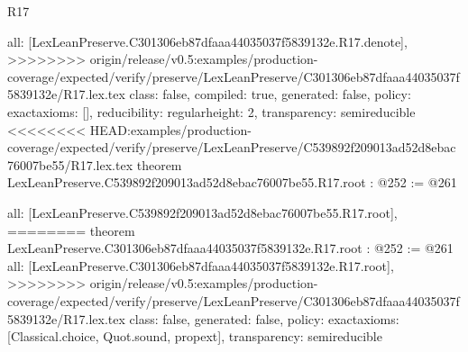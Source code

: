 \begin{lexlean}{R17}
\begin{coremodule}
{{{{{  all: [LexLeanPreserve.C301306eb87dfaaa44035037f5839132e.R17.denote],
>>>>>>>> origin/release/v0.5:examples/production-coverage/expected/verify/preserve/LexLeanPreserve/C301306eb87dfaaa44035037f5839132e/R17.lex.tex
  class: false,
  compiled: true,
  generated: false,
  policy: exact{axioms: []},
  reducibility: regular{height: 2},
  transparency: semireducible
}
<<<<<<<< HEAD:examples/production-coverage/expected/verify/preserve/LexLeanPreserve/C539892f209013ad52d8ebac76007be55/R17.lex.tex
theorem LexLeanPreserve.C539892f209013ad52d8ebac76007be55.R17.root : @252 := @261 {
  all: [LexLeanPreserve.C539892f209013ad52d8ebac76007be55.R17.root],
========
theorem LexLeanPreserve.C301306eb87dfaaa44035037f5839132e.R17.root : @252 := @261 {
  all: [LexLeanPreserve.C301306eb87dfaaa44035037f5839132e.R17.root],
>>>>>>>> origin/release/v0.5:examples/production-coverage/expected/verify/preserve/LexLeanPreserve/C301306eb87dfaaa44035037f5839132e/R17.lex.tex
  class: false,
  generated: false,
  policy: exact{axioms: [Classical.choice, Quot.sound, propext]},
  transparency: semireducible
}

}}}}}
\end{coremodule}
\end{lexlean}
